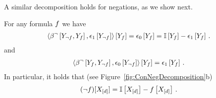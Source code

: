 A similar decomposition holds for negations, as we show next.

\begin{theorem}
    For any formula $f$ we have
    \begin{align*}
        \left\langle 
            \beta^{\lnot}\left[Y_{\lnot f},Y_{f}\right],\epsilon_1\left[Y_{\lnot f}\right]
        \right\rangle \left[ Y_{f} \right]
        = \epsilon_0\left[Y_{f}\right] =  \mathbb{I}\left[Y_{f}\right] - \epsilon_1\left[Y_{f}\right] \, .
    \end{align*}
    and
    \begin{align*}
        \left\langle 
            \beta^{\lnot}\left[Y_{f},Y_{\lnot f}\right],\epsilon_0\left[Y_{\lnot f}\right]
        \right\rangle \left[ Y_{f} \right]
        = \epsilon_1\left[Y_{f}\right] \, .
    \end{align*}
    In particular, it holds that (see Figure~\ref{fig:ConNegDecomposition}b)
    \begin{align*}
    (\lnot f)[X_{[d]}]
        = \mathbb{I}\left[X_{[d]}\right] - f\left[X_{[d]}\right]  \, .
    \end{align*}
\end{theorem}
